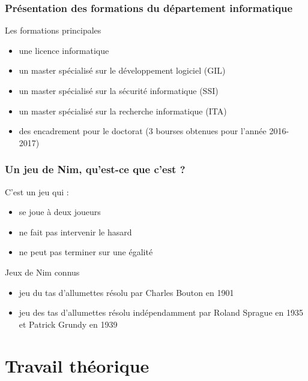 \documentclass{beamer}
\begin{document}
  \begin{frame}
    \frametitle{Présentation des formations du département informatique}

    \begin{block} {Les formations principales}
      \begin{itemize}
        \item une licence informatique
        \item un master spécialisé sur le développement logiciel (GIL)
        \item un master spécialisé sur la sécurité informatique (SSI)
        \item un master spécialisé sur la recherche informatique (ITA)
        \item des encadrement pour le doctorat (3 bourses obtenues pour l’année 2016-2017)
      \end{itemize}
    \end{block}
  \end{frame}
  \begin{frame}
    \frametitle{Un jeu de Nim, qu'est-ce que c'est ?}

    \begin{block} {C'est un jeu qui :}
      \begin{itemize}
        \item se joue à deux joueurs 
        \item ne fait pas intervenir le hasard
        \item ne peut pas terminer sur une égalité
      \end{itemize}
    \end{block}
    
    \pause

    \begin{block} {Jeux de Nim connus}
      \begin{itemize}
        \item jeu du tas d’allumettes résolu par Charles Bouton en 1901
        \item jeu des tas d'allumettes résolu indépendamment par Roland Sprague en 1935 et Patrick Grundy en 1939
      \end{itemize}
    \end{block}
  \end{frame}

  \section{Travail théorique}
  \label{sec: Travail théorique}
\end{document}

